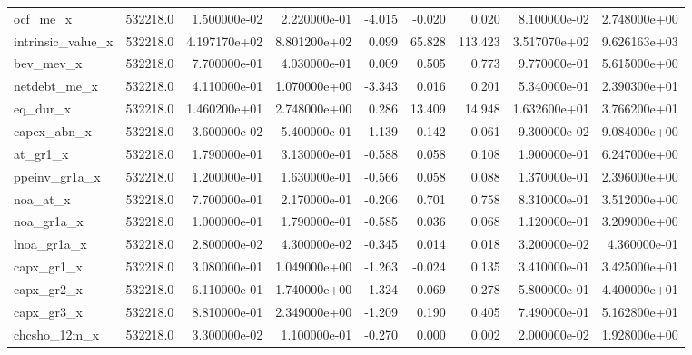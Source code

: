 \documentclass[12pt]{article}
\begin{document}
\begin{landscape}
\begin{longtable}{|l|r|r|r|r|r|r|r|r|}
		ocf\_me\_x               & 532218.0 & 1.500000e-02  & 2.220000e-01 & -4.015     & -0.020      & 0.020       & 8.100000e-02  & 2.748000e+00 \\
		intrinsic\_value\_x      & 532218.0 & 4.197170e+02  & 8.801200e+02 & 0.099      & 65.828      & 113.423     & 3.517070e+02  & 9.626163e+03 \\
		bev\_mev\_x              & 532218.0 & 7.700000e-01  & 4.030000e-01 & 0.009      & 0.505       & 0.773       & 9.770000e-01  & 5.615000e+00 \\
		netdebt\_me\_x           & 532218.0 & 4.110000e-01  & 1.070000e+00 & -3.343     & 0.016       & 0.201       & 5.340000e-01  & 2.390300e+01 \\
		eq\_dur\_x               & 532218.0 & 1.460200e+01  & 2.748000e+00 & 0.286      & 13.409      & 14.948      & 1.632600e+01  & 3.766200e+01 \\
		capex\_abn\_x            & 532218.0 & 3.600000e-02  & 5.400000e-01 & -1.139     & -0.142      & -0.061      & 9.300000e-02  & 9.084000e+00 \\
		at\_gr1\_x               & 532218.0 & 1.790000e-01  & 3.130000e-01 & -0.588     & 0.058       & 0.108       & 1.900000e-01  & 6.247000e+00 \\
		ppeinv\_gr1a\_x          & 532218.0 & 1.200000e-01  & 1.630000e-01 & -0.566     & 0.058       & 0.088       & 1.370000e-01  & 2.396000e+00 \\
		noa\_at\_x               & 532218.0 & 7.700000e-01  & 2.170000e-01 & -0.206     & 0.701       & 0.758       & 8.310000e-01  & 3.512000e+00 \\
		noa\_gr1a\_x             & 532218.0 & 1.000000e-01  & 1.790000e-01 & -0.585     & 0.036       & 0.068       & 1.120000e-01  & 3.209000e+00 \\
		lnoa\_gr1a\_x            & 532218.0 & 2.800000e-02  & 4.300000e-02 & -0.345     & 0.014       & 0.018       & 3.200000e-02  & 4.360000e-01 \\
		capx\_gr1\_x             & 532218.0 & 3.080000e-01  & 1.049000e+00 & -1.263     & -0.024      & 0.135       & 3.410000e-01  & 3.425000e+01 \\
		capx\_gr2\_x             & 532218.0 & 6.110000e-01  & 1.740000e+00 & -1.324     & 0.069       & 0.278       & 5.800000e-01  & 4.400000e+01 \\
		capx\_gr3\_x             & 532218.0 & 8.810000e-01  & 2.349000e+00 & -1.209     & 0.190       & 0.405       & 7.490000e-01  & 5.162800e+01 \\
		chcsho\_12m\_x           & 532218.0 & 3.300000e-02  & 1.100000e-01 & -0.270     & 0.000       & 0.002       & 2.000000e-02  & 1.928000e+00 \\

\end{longtable}
\end{landscape}
\end{document}
